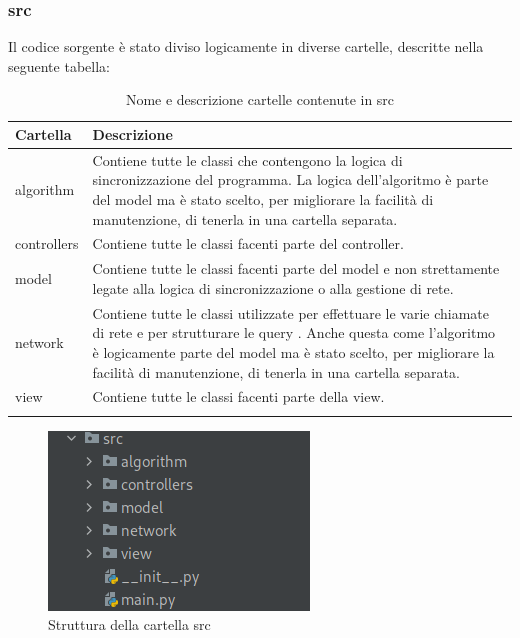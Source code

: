 \subsubsection{src} \label{sec:cartelle-src}
Il codice sorgente è stato diviso logicamente in diverse cartelle, descritte nella seguente tabella:
{
	\setlength{\freewidth}{\dimexpr\textwidth-1\tabcolsep}
	\renewcommand{\arraystretch}{1.5}
	\setlength{\aboverulesep}{0pt}
	\setlength{\belowrulesep}{0pt}
	\begin{longtable}{L{.15\freewidth} L{.85\freewidth}}
		\textbf{Cartella} & \textbf{Descrizione}\\
		\toprule
		\endhead	
		algorithm & Contiene tutte le classi che contengono la logica di sincronizzazione del programma. La logica dell'algoritmo è parte del model ma è stato scelto, per migliorare la facilità di manutenzione, di tenerla in una cartella separata.\\
		controllers & Contiene tutte le classi facenti parte del controller.\\
		model & Contiene tutte le classi facenti parte del model e non strettamente legate alla logica di sincronizzazione o alla gestione di rete.\\
		network & Contiene tutte le classi utilizzate per effettuare le varie chiamate di rete e per strutturare le query . Anche questa come l'algoritmo è logicamente parte del model ma è stato scelto, per migliorare la facilità di manutenzione, di tenerla in una cartella separata. \\
		view & Contiene tutte le classi facenti parte della view. \\
		\bottomrule
		\hiderowcolors
		\caption{Nome e descrizione cartelle contenute in src}
	\end{longtable}
}
\begin{figure}[H]
    \centering
    \includegraphics[scale = 0.5]{components/img/struttura-cartella-src.png}
    \caption{Struttura della cartella src}
    \label{fig:Struttura della cartella src}
\end{figure}    
